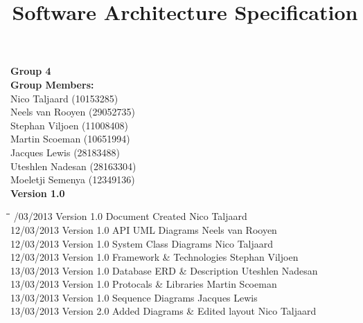 \documentclass[12pt]{article}
\title{Software Architecture Specification}
\begin{document}

\maketitle

\vspace{4em}

\begin{center}%

  \LARGE {\bf Group 4}\\[2em]
  \LARGE {\bf Group Members:}\\[1em]
  \large
      Nico Taljaard			(10153285)	\\
      Neels van Rooyen		(29052735)	\\
	  Stephan Viljoen       (11008408)  \\
	  Martin Scoeman		(10651994)	\\
	  Jacques Lewis			(28183488)	\\
	  Uteshlen Nadesan		(28163304)	\\
	  Moeletji Semenya		(12349136)	\\[6em]
      
      {\bf Version 1.0}
    
\end{center}%

\newpage


\begin{tabbing}
\hspace*{3cm}\=\hspace*{3cm}\=\hspace*{8cm}\=\hspace*{3cm} /03/2013 \> Version 1.0 \> Document Created \> Nico Taljaard\\
12/03/2013 \> Version 1.0 \> API UML Diagrams \> Neels van Rooyen\\
12/03/2013 \> Version 1.0 \> System Class Diagrams \> Nico Taljaard\\
12/03/2013 \> Version 1.0 \> Framework \& Technologies \> Stephan Viljoen\\
13/03/2013 \> Version 1.0 \> Database ERD \& Description \> Uteshlen Nadesan\\
13/03/2013 \> Version 1.0 \> Protocals \& Libraries \> Martin Scoeman\\
13/03/2013 \> Version 1.0 \> Sequence Diagrams \> Jacques Lewis\\
13/03/2013 \> Version 2.0 \> Added Diagrams \& Edited layout \> Nico Taljaard\\

\end{tabbing}
\end{document}
